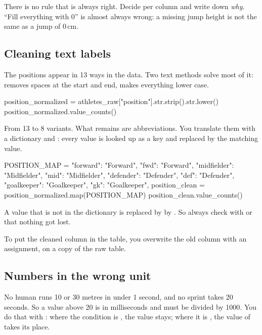 \documentclass[11pt,a4paper]{article}
\begin{document}
\begin{keyidea}
There is no rule that is always right. Decide per column and write down
\emph{why}. ``Fill everything with 0'' is almost always wrong: a missing
jump height is not the same as a jump of 0\,cm.
\end{keyidea}

\subsection{Cleaning text labels}

The positions appear in 13 ways in the data. Two text methods solve most
of it:  removes spaces at the start and end,
 makes everything lower case.

\begin{python}
position_normalized = athletes_raw["position"].str.strip().str.lower()
position_normalized.value_counts()
\end{python}

From 13 to 8 variants. What remains are abbreviations. You translate
them with a dictionary and : every value is looked up as
a key and replaced by the matching value.

\begin{python}
POSITION_MAP = {
    "forward": "Forward", "fwd": "Forward",
    "midfielder": "Midfielder", "mid": "Midfielder",
    "defender": "Defender", "def": "Defender",
    "goalkeeper": "Goalkeeper", "gk": "Goalkeeper",
}
position_clean = position_normalized.map(POSITION_MAP)
position_clean.value_counts()
\end{python}

\begin{watchout}
A value that is not in the dictionary is replaced by  by
. So always check with  or
 that nothing got lost.
\end{watchout}

To put the cleaned column in the table, you overwrite the old column
with an assignment, on a copy of the raw table.

\subsection{Numbers in the wrong unit}

No human runs 10 or 30 metres in under 1 second, and no sprint takes 20
seconds. So a value above 20 is in milliseconds and must be divided by
1000. You do that with : where the
condition is , the value stays; where it is , the
value of  takes its place.
\end{document}
